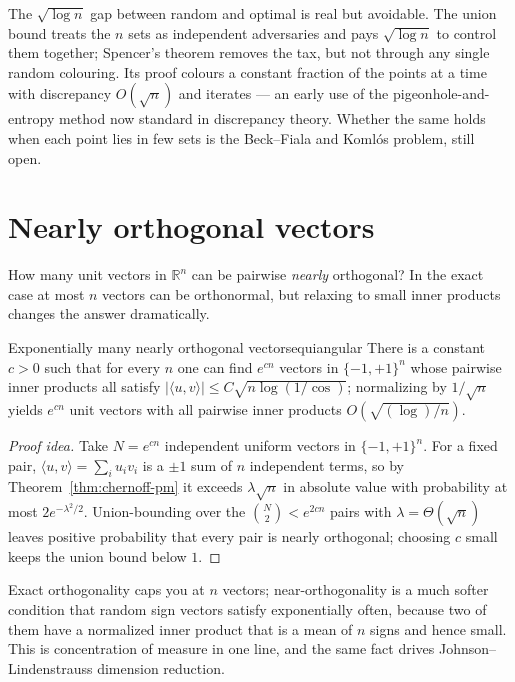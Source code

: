 \begin{insight}
The $\sqrt{\log n}$ gap between random and optimal is real but avoidable. The
union bound treats the $n$ sets as independent adversaries and pays
$\sqrt{\log n}$ to control them together; Spencer's theorem removes the tax, but
not through any single random colouring. Its proof colours a constant fraction
of the points at a time with discrepancy $O(\sqrt n)$ and iterates --- an early
use of the pigeonhole-and-entropy method now standard in discrepancy theory.
Whether the same holds when each point lies in few sets is the Beck--Fiala and
Koml\'os problem, still open.
\end{insight}

\section{Nearly orthogonal vectors}

How many unit vectors in $\mathbb R^n$ can be pairwise \emph{nearly} orthogonal?
In the exact case at most $n$ vectors can be orthonormal, but relaxing to small
inner products changes the answer dramatically.

\begin{theorem}{Exponentially many nearly orthogonal vectors}{equiangular}
There is a constant $c>0$ such that for every $n$ one can find
$e^{cn}$ vectors in $\{-1,+1\}^n$ whose pairwise inner products all satisfy
$|\langle u,v\rangle|\le C\sqrt{n\log(1/\!\cos)}$; normalizing by $1/\sqrt n$
yields $e^{cn}$ unit vectors with all pairwise inner products $O(\sqrt{(\log)/n})$.
\end{theorem}

\begin{proof}[Proof idea]
Take $N=e^{cn}$ independent uniform vectors in $\{-1,+1\}^n$. For a fixed pair,
$\langle u,v\rangle=\sum_i u_iv_i$ is a $\pm1$ sum of $n$ independent terms, so
by Theorem~\ref{thm:chernoff-pm} it exceeds $\lambda\sqrt n$ in absolute value
with probability at most $2e^{-\lambda^2/2}$. Union-bounding over the
$\binom N2<e^{2cn}$ pairs with $\lambda=\Theta(\sqrt n)$ leaves positive
probability that every pair is nearly orthogonal; choosing $c$ small keeps the
union bound below $1$.
\end{proof}

\begin{insight}
Exact orthogonality caps you at $n$ vectors; near-orthogonality is a much softer
condition that random sign vectors satisfy exponentially often, because two of
them have a normalized inner product that is a mean of $n$ signs and hence
small. This is concentration of measure in one line, and the same fact drives
Johnson--Lindenstrauss dimension reduction.
\end{insight}

